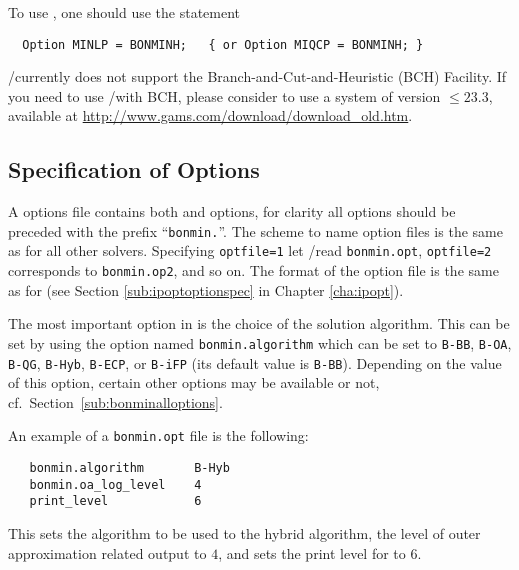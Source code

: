 To use \BONMINH, one should use the statement
\begin{verbatim}
  Option MINLP = BONMINH;   { or Option MIQCP = BONMINH; }
\end{verbatim}

\GAMS/\BONMIN currently does not support the \GAMS Branch-and-Cut-and-Heuristic (BCH) Facility.
If you need to use \GAMS/\BONMIN with BCH, please consider to use a \GAMS system of version $\leq 23.3$, available at \url{http://www.gams.com/download/download_old.htm}.

\subsection{Specification of Options}

A \BONMIN options file contains both \IPOPT and \BONMIN options, for clarity all \BONMIN options should be preceded with the prefix ``\texttt{bonmin.}''. %
The scheme to name option files is the same as for all other \GAMS solvers.
Specifying \texttt{optfile=1} let \GAMS/\BONMIN read \texttt{bonmin.opt}, \texttt{optfile=2} corresponds to \texttt{bonmin.op2}, and so on.
The format of the option file is the same as for \IPOPT (see Section \ref{sub:ipoptoptionspec} in Chapter \ref{cha:ipopt}).

The most important option in \BONMIN is the choice of the solution algorithm.
This can be set by using the option named \texttt{bonmin.algorithm} which can be set to \texttt{B-BB}, \texttt{B-OA}, \texttt{B-QG}, \texttt{B-Hyb}, \texttt{B-ECP}, or \texttt{B-iFP} (its default value is \texttt{B-BB}).
Depending on the value of this option, certain other options may be available or not, cf.\ Section~\ref{sub:bonminalloptions}.

An example of a \texttt{bonmin.opt} file is the following:
\begin{verbatim}
   bonmin.algorithm       B-Hyb
   bonmin.oa_log_level    4
   print_level            6
\end{verbatim}
This sets the algorithm to be used to the hybrid algorithm, the level of outer approximation related output to $4$,
and sets the print level for \IPOPT to $6$.

